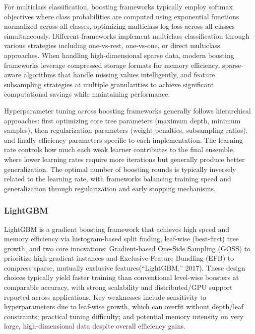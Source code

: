 \documentclass[
  titlepage]{article}
\begin{document}
For multiclass classification, boosting frameworks typically employ
softmax objectives where class probabilities are computed using
exponential functions normalized across all classes, optimizing
multiclass log-loss across all classes simultaneously. Different
frameworks implement multiclass classification through various
strategies including one-vs-rest, one-vs-one, or direct multiclass
approaches. When handling high-dimensional sparse data, modern boosting
frameworks leverage compressed storage formats for memory efficiency,
sparse-aware algorithms that handle missing values intelligently, and
feature subsampling strategies at multiple granularities to achieve
significant computational savings while maintaining performance.

Hyperparameter tuning across boosting frameworks generally follows
hierarchical approaches: first optimizing core tree parameters (maximum
depth, minimum samples), then regularization parameters (weight
penalties, subsampling ratios), and finally efficiency parameters
specific to each implementation. The learning rate controls how much
each weak learner contributes to the final ensemble, where lower
learning rates require more iterations but generally produce better
generalization. The optimal number of boosting rounds is typically
inversely related to the learning rate, with frameworks balancing
training speed and generalization through regularization and early
stopping mechanisms.

\subsubsection{LightGBM}\label{lightgbm}

LightGBM is a gradient boosting framework that achieves high speed and
memory efficiency via histogram-based split finding, leaf-wise
(best-first) tree growth, and two core innovations: Gradient-based
One-Side Sampling (GOSS) to prioritize high-gradient instances and
Exclusive Feature Bundling (EFB) to compress sparse, mutually exclusive
features({``LightGBM,''} 2017). These design choices typically yield
faster training than conventional level-wise boosters at comparable
accuracy, with strong scalability and distributed/GPU support reported
across applications. Key weaknesses include sensitivity to
hyperparameters due to leaf-wise growth, which can overfit without
depth/leaf constraints; practical tuning difficulty; and potential
memory intensity on very large, high-dimensional data despite overall
efficiency gains.
\end{document}
